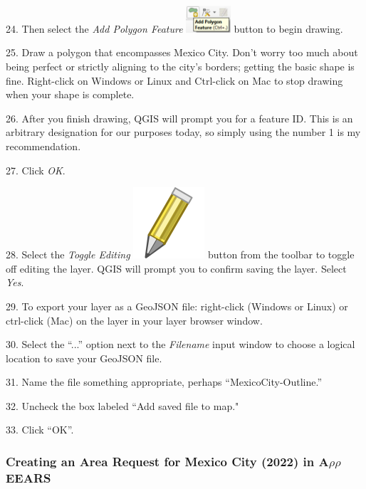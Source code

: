 \documentclass[oneside,a4paper,11pt,explicit]{book}
\begin{document}
24. Then select the \textit{Add Polygon Feature} \includegraphics[height=10mm]{addpolygon.png} button to begin drawing. 

25. Draw a polygon that encompasses Mexico City. Don't worry too much about being perfect or strictly aligning to the city's borders; getting the basic shape is fine. Right-click on Windows or Linux and Ctrl-click on Mac to stop drawing when your shape is complete.


26. After you finish drawing, QGIS will prompt you for a feature ID. This is an arbitrary designation for our purposes today, so simply using the number 1 is my recommendation. 

27. Click \textit{OK}. 

28. Select the \textit{Toggle Editing} \includegraphics[height=\fontcharht\font`\B]{mActionToggleEditing.png} button from the toolbar to toggle off editing the layer. QGIS will prompt you to confirm saving the layer. Select \textit{Yes}.

29. To export your layer as a GeoJSON file: right-click (Windows or Linux) or ctrl-click (Mac) on the layer in your layer browser window. 

30. Select the ``...'' option next to the \textit{Filename} input window to choose a logical location to save your GeoJSON file.

31. Name the file something appropriate, perhaps ``MexicoCity-Outline.'' 

32. Uncheck the box labeled ``Add saved file to map." 

33. Click ``OK''.

\subsubsection{Creating an Area Request for Mexico City (2022) in A$\rho\rho$EEARS}
\end{document}
